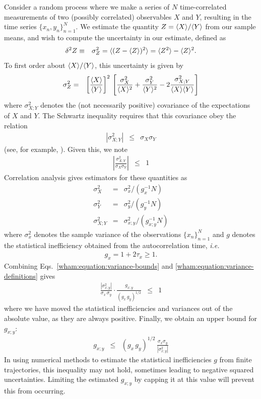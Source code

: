 Consider a random process where we make a series of $N$ time-correlated measurements of two (possibly correlated) observables $X$ and $Y$, resulting in the time series $\{x_n,y_n\}_{n=1}^N$. We estimate the quantity $Z = \langle X \rangle/\langle Y \rangle$ from our sample means, and wish to compute the uncertainty in our estimate, defined as
\begin{eqnarray}
\delta^2 Z &\equiv& \sigma^2_Z = \langle (Z-\langle Z \rangle)^2 \rangle = \langle Z^2 \rangle - \langle Z \rangle^2 .
\end{eqnarray}
To first order about $\langle X \rangle/\langle Y \rangle$, this uncertainty is given by
\begin{eqnarray}
\sigma^2_Z &=& \left[\frac{\langle X \rangle}{\langle Y \rangle}\right]^2 \, \left[ \frac{\sigma^2_X}{\langle X \rangle^2} + \frac{\sigma^2_Y}{\langle Y \rangle^2} - 2 \frac{\sigma^2_{X;Y}}{\langle X \rangle \langle Y \rangle} \right]
\end{eqnarray}
where $\sigma^2_{X;Y}$ denotes the (not necessarily positive) covariance of the expectations of $X$ and $Y$.  The Schwartz inequality requires that this covariance obey the relation
\begin{eqnarray}
|\sigma^2_{X;Y}| &\le& \sigma_X \sigma_Y
\end{eqnarray}
(see, for example, \cite{casella:statistical-inference}). Given this, we note
\begin{eqnarray}
\left| \frac{\sigma^2_{X;Y}}{\sigma_X \sigma_Y} \right| &\le& 1 \label{wham:equation:variance-bounds}
\end{eqnarray}
Correlation analysis gives estimators for these quantities as
\begin{eqnarray}
\sigma^2_X &=& \sigma^2_x / (g_x^{-1} N) \nonumber \\
\sigma^2_Y &=& \sigma^2_y / (g_y^{-1} N) \nonumber \\
\sigma^2_{X;Y} &=& \sigma^2_{x;y} / (g_{x;y}^{-1} N) \label{wham:equation:variance-definitions}
\end{eqnarray}
where $\sigma^2_x$ denotes the sample variance of the observations $\{x_n\}_{n=1}^N$ and $g$ denotes the statistical inefficiency obtained from the autocorrelation time, \emph{i.e.}
\begin{eqnarray}
g_x = 1 + 2 \tau_x \ge 1.
\end{eqnarray}
Combining Eqs.\ \ref{wham:equation:variance-bounds} and \ref{wham:equation:variance-definitions} gives
\begin{eqnarray}
\frac{| \sigma^2_{x;y}|}{\sigma_x \, \sigma_y} \cdot \frac{g_{x;y}}{( g_x \, g_y )^{1/2}} &\le& 1
\end{eqnarray}
where we have moved the statistical inefficiencies and variances out of the absolute value, as they are always positive.  Finally, we obtain an upper bound for $g_{x;y}$:
\begin{eqnarray}
g_{x;y} &\le& ( g_x \, g_y )^{1/2} \, \frac{\sigma_x \sigma_y}{|\sigma^2_{x;y}|}
\end{eqnarray}
In using numerical methods to estimate the statistical inefficiencies $g$ from finite trajectories, this inequality may not hold, sometimes leading to negative squared uncertainties.  Limiting the estimated $g_{x;y}$ by capping it at this value will prevent this from occurring.

